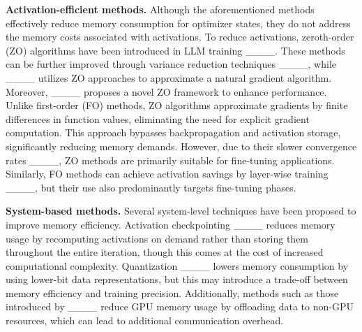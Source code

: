 \textbf{Activation-efficient methods.} 
Although the aforementioned methods effectively reduce memory consumption for optimizer states, they do not address the memory costs associated with activations. To reduce activations, zeroth-order (ZO) algorithms have been introduced in LLM training ____. These methods can be further improved through variance reduction techniques ____, while ____ utilizes ZO approaches to approximate a natural gradient algorithm. Moreover, ____ proposes a novel ZO framework to enhance performance. Unlike first-order (FO) methods, ZO algorithms approximate gradients by finite differences in function values, eliminating the need for explicit gradient computation. This approach bypasses backpropagation and activation storage, significantly reducing memory demands. However, due to their slower convergence rates ____, ZO methods are primarily suitable for fine-tuning applications. Similarly, FO methods can achieve activation savings by layer-wise training ____, but their use also predominantly targets fine-tuning phases.

\textbf{System-based methods.} 
Several system-level techniques have been proposed to improve memory efficiency. Activation checkpointing ____ reduces memory usage by recomputing activations on demand rather than storing them throughout the entire iteration, though this comes at the cost of increased computational complexity. Quantization ____ lowers memory consumption by using lower-bit data representations, but this may introduce a trade-off between memory efficiency and training precision. Additionally, methods such as those introduced by ____ reduce GPU memory usage by offloading data to non-GPU resources, which can lead to additional communication overhead.